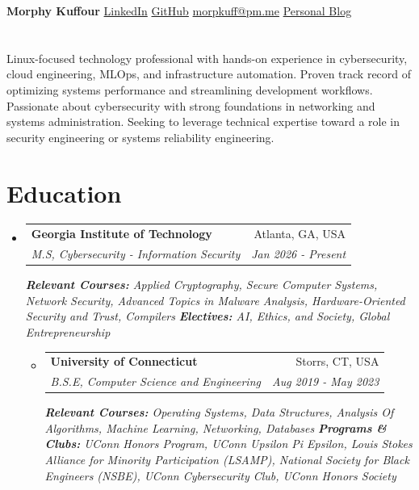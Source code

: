 \documentclass[a4paper,11pt]{article}
\makeatletter
\newcommand{\resumeSubheading}[4]{
  \vspace{-1pt}\item
    \begin{tabular*}{0.97\textwidth}{l@{\extracolsep{\fill}}r}
      \textbf{#1} & #2 \\
      \textit{#3} & \textit{#4} \\
    \end{tabular*}\vspace{-5pt}
}
\newcommand{\resumeSubHeadingListStart}{\begin{itemize}[leftmargin=*]}
\makeatother
\begin{document}
  \textbf{Morphy Kuffour} \textbar{} \href{https://www.linkedin.com/in/morphy-kuffour/}{LinkedIn} \textbar{} \href{https://github.com/morphykuffour}{GitHub} \textbar{} \href{mailto:morpkuff@pm.me}{morpkuff@pm.me} \textbar{} \href{https://morphykuffour.github.io/}{Personal Blog} 

\vspace{-13pt}

\section{}
Linux-focused technology professional with hands-on experience in cybersecurity, cloud engineering, MLOps, and infrastructure automation. Proven track record of optimizing systems performance and streamlining development workflows. Passionate about cybersecurity with strong foundations in networking and systems administration. Seeking to leverage technical expertise toward a role in security engineering or systems reliability engineering.

\section{Education}
\vspace{5pt}
  \begin{itemize}[leftmargin=0pt, label={}]  %
    \resumeSubheading
      {Georgia Institute of Technology}{Atlanta, GA, USA}
      {M.S, Cybersecurity - Information Security}{Jan 2026 - Present}
      \vspace{5pt}
      {\scriptsize \textit{ \footnotesize{\newline{}\textbf{Relevant Courses:} Applied Cryptography, Secure Computer Systems, Network Security, Advanced Topics in Malware Analysis, Hardware-Oriented Security and Trust, Compilers}}}
      {\scriptsize \textit{ \footnotesize{\newline{}\textbf{Electives:} AI, Ethics, and Society, Global Entrepreneurship }}}
      \vspace{2pt}
  \begin{itemize}[leftmargin=0pt, label={}]  %
    \resumeSubheading
      {University of Connecticut}{Storrs, CT, USA}
      {B.S.E, Computer Science and Engineering}{Aug 2019 - May 2023}
      \vspace{5pt}
      {\scriptsize \textit{ \footnotesize{\newline{}\textbf{Relevant Courses:} Operating Systems, Data Structures, Analysis Of Algorithms, Machine Learning, Networking, Databases}}}
      {\scriptsize \textit{ \footnotesize{\newline{}\textbf{Programs \& Clubs:}
  UConn Honors Program, UConn Upsilon Pi Epsilon, Louis Stokes Alliance for Minority Participation (LSAMP), National Society for Black Engineers (NSBE), UConn Cybersecurity Club, UConn Honors Society}}}
  \end{itemize}
  \end{itemize}
\end{document}
